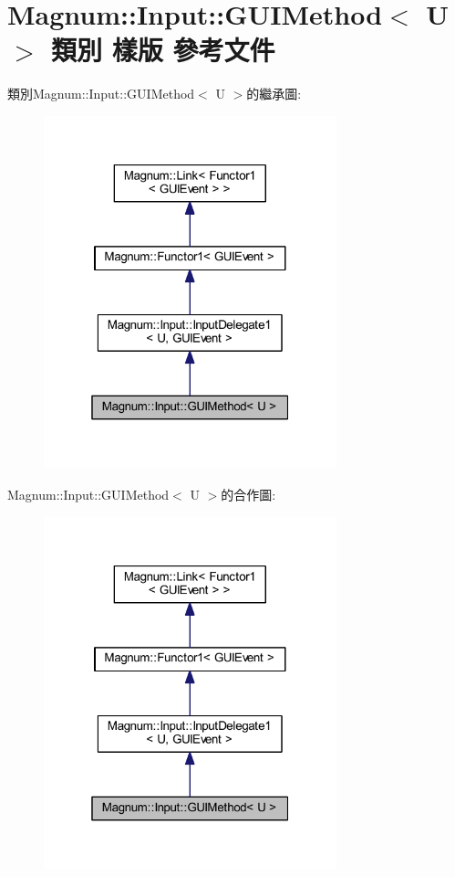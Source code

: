 \hypertarget{class_magnum_1_1_input_1_1_g_u_i_method}{}\section{Magnum\+:\+:Input\+:\+:G\+U\+I\+Method$<$ U $>$ 類別 樣版 參考文件}
\label{class_magnum_1_1_input_1_1_g_u_i_method}


類別\+Magnum\+:\+:Input\+:\+:G\+U\+I\+Method$<$ U $>$的繼承圖\+:\nopagebreak
\begin{figure}[H]
\begin{center}
\leavevmode
\includegraphics[width=241pt]{class_magnum_1_1_input_1_1_g_u_i_method__inherit__graph}
\end{center}
\end{figure}


Magnum\+:\+:Input\+:\+:G\+U\+I\+Method$<$ U $>$的合作圖\+:\nopagebreak
\begin{figure}[H]
\begin{center}
\leavevmode
\includegraphics[width=241pt]{class_magnum_1_1_input_1_1_g_u_i_method__coll__graph}
\end{center}
\end{figure}
